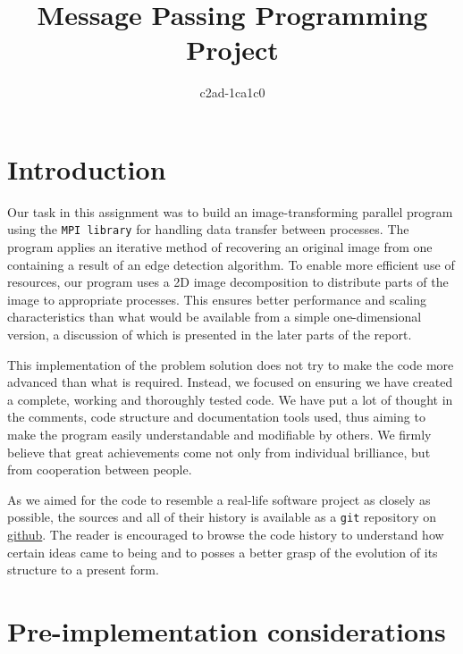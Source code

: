 \documentclass[11pt,a4paper]{article}
\begin{document}
\title{Message Passing Programming Project}
\author{c2ad-1ca1c0}
\maketitle

\section{Introduction}
Our task in this assignment was to build an image-transforming parallel program using the \texttt{MPI library} for handling data transfer between processes.
The program applies an iterative method of recovering an original image from one containing a result of an edge detection algorithm. 
To enable more efficient use of resources, our program uses a 2D image decomposition to distribute parts of the image to appropriate processes. 
This ensures better performance and scaling characteristics than what would be available from a simple one-dimensional version, a discussion of which is presented in the later parts of the report.

This implementation of the problem solution does not try to make the code more advanced than what is required. 
Instead, we focused on ensuring we have created a complete, working and thoroughly tested code. 
We have put a lot of thought in the comments, code structure and documentation tools used, thus aiming to make the program easily understandable and modifiable by others. 
We firmly believe that great achievements come not only from individual brilliance, but from cooperation between people.

As we aimed for the code to resemble a real-life software project as closely as possible, the sources and all of their history is available as a \texttt{git} repository on \href{https://github.com/mkawalec/5thyear/tree/master/mpp/MPP-casestudy}{github}. 
The reader is encouraged to browse the code history to understand how certain ideas came to being and to posses a better grasp of the evolution of its structure to a present form.

\section{Pre-implementation considerations}
\end{document}
